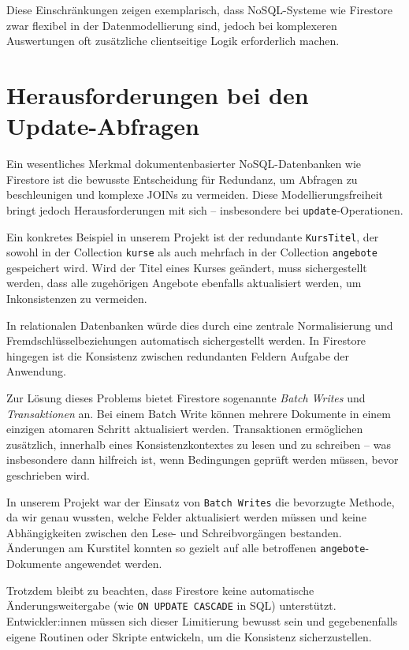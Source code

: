 \documentclass[12pt,a4paper%
              ,oneside     %
              ,titlepage
              ,DIV=13
              ,headinclude
              ,footinclude=false%
              ,cleardoublepage=empty%
              ,parskip=half,
              BCOR=0mm,
              ]{scrreprt}
\begin{document}
Diese Einschränkungen zeigen exemplarisch, dass NoSQL-Systeme wie Firestore zwar flexibel in der Datenmodellierung sind, jedoch bei komplexeren Auswertungen oft zusätzliche clientseitige Logik erforderlich machen.

\chapter{Herausforderungen bei den Update-Abfragen}
\label{update-label}

Ein wesentliches Merkmal dokumentenbasierter NoSQL-Datenbanken wie Firestore ist die bewusste Entscheidung für Redundanz, um Abfragen zu beschleunigen und komplexe JOINs zu vermeiden. Diese Modellierungsfreiheit bringt jedoch Herausforderungen mit sich – insbesondere bei \texttt{update}-Operationen.

Ein konkretes Beispiel in unserem Projekt ist der redundante \texttt{KursTitel}, der sowohl in der Collection \texttt{kurse} als auch mehrfach in der Collection \texttt{angebote} gespeichert wird. Wird der Titel eines Kurses geändert, muss sichergestellt werden, dass alle zugehörigen Angebote ebenfalls aktualisiert werden, um Inkonsistenzen zu vermeiden.

In relationalen Datenbanken würde dies durch eine zentrale Normalisierung und Fremdschlüsselbeziehungen automatisch sichergestellt werden. In Firestore hingegen ist die Konsistenz zwischen redundanten Feldern Aufgabe der Anwendung.

Zur Lösung dieses Problems bietet Firestore sogenannte \textit{Batch Writes} und \textit{Transaktionen} an. Bei einem Batch Write können mehrere Dokumente in einem einzigen atomaren Schritt aktualisiert werden. Transaktionen ermöglichen zusätzlich, innerhalb eines Konsistenzkontextes zu lesen und zu schreiben – was insbesondere dann hilfreich ist, wenn Bedingungen geprüft werden müssen, bevor geschrieben wird.

In unserem Projekt war der Einsatz von \texttt{Batch Writes} die bevorzugte Methode, da wir genau wussten, welche Felder aktualisiert werden müssen und keine Abhängigkeiten zwischen den Lese- und Schreibvorgängen bestanden. Änderungen am Kurstitel konnten so gezielt auf alle betroffenen \texttt{angebote}-Dokumente angewendet werden.

Trotzdem bleibt zu beachten, dass Firestore keine automatische Änderungsweitergabe (wie \texttt{ON UPDATE CASCADE} in SQL) unterstützt. Entwickler:innen müssen sich dieser Limitierung bewusst sein und gegebenenfalls eigene Routinen oder Skripte entwickeln, um die Konsistenz sicherzustellen.
\end{document}
